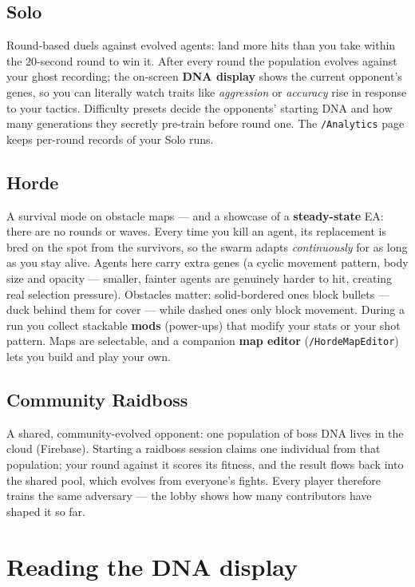 \documentclass[11pt,a4paper]{report}
\newcommand{\route}[1]{\texttt{#1}}          %
\newcommand{\uielem}[1]{\textsf{\textbf{#1}}} %
\begin{document}
\subsection{Solo}

Round-based duels against evolved agents: land more hits than you take
within the 20-second round to win it. After every round the population
evolves against your ghost recording; the on-screen \uielem{DNA display}
shows the current opponent's genes, so you can literally watch traits like
\emph{aggression} or \emph{accuracy} rise in response to your tactics.
Difficulty presets decide the opponents' starting DNA and how many
generations they secretly pre-train before round one. The
\route{/Analytics} page keeps per-round records of your Solo runs.

\subsection{Horde}

A survival mode on obstacle maps --- and a showcase of a
\textbf{steady-state} EA: there are no rounds or waves. Every time you kill
an agent, its replacement is bred on the spot from the survivors, so the
swarm adapts \emph{continuously} for as long as you stay alive. Agents here
carry extra genes (a cyclic movement pattern, body size and opacity ---
smaller, fainter agents are genuinely harder to hit, creating real
selection pressure). Obstacles matter: solid-bordered ones block bullets
--- duck behind them for cover --- while dashed ones only block movement.
During a run you collect stackable \textbf{mods} (power-ups) that modify
your stats or your shot pattern. Maps are selectable, and a companion
\textbf{map editor} (\route{/HordeMapEditor}) lets you build and play your
own.

\subsection{Community Raidboss}

A shared, community-evolved opponent: one population of boss DNA lives in
the cloud (Firebase). Starting a raidboss session claims one individual
from that population; your round against it scores its fitness, and the
result flows back into the shared pool, which evolves from everyone's
fights. Every player therefore trains the same adversary --- the lobby
shows how many contributors have shaped it so far.

\section{Reading the DNA display}
\end{document}
